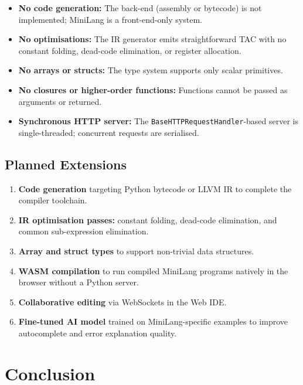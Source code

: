 \documentclass[conference]{IEEEtran}
\begin{document}
\begin{itemize}
  \item \textbf{No code generation:} The back-end (assembly or
        bytecode) is not implemented; MiniLang is a front-end-only
        system.
  \item \textbf{No optimisations:} The IR generator emits
        straightforward TAC with no constant folding, dead-code
        elimination, or register allocation.
  \item \textbf{No arrays or structs:} The type system supports only
        scalar primitives.
  \item \textbf{No closures or higher-order functions:} Functions
        cannot be passed as arguments or returned.
  \item \textbf{Synchronous HTTP server:} The
        \texttt{BaseHTTPRequestHandler}-based server is
        single-threaded; concurrent requests are serialised.
\end{itemize}

\subsection{Planned Extensions}

\begin{enumerate}
  \item \textbf{Code generation} targeting Python bytecode or LLVM IR
        to complete the compiler toolchain.
  \item \textbf{IR optimisation passes:} constant folding, dead-code
        elimination, and common sub-expression elimination.
  \item \textbf{Array and struct types} to support non-trivial data
        structures.
  \item \textbf{WASM compilation} to run compiled MiniLang programs
        natively in the browser without a Python server.
  \item \textbf{Collaborative editing} via WebSockets in the Web IDE.
  \item \textbf{Fine-tuned AI model} trained on MiniLang-specific
        examples to improve autocomplete and error explanation quality.
\end{enumerate}

\section{Conclusion}
\label{sec:conclusion}
\end{document}
